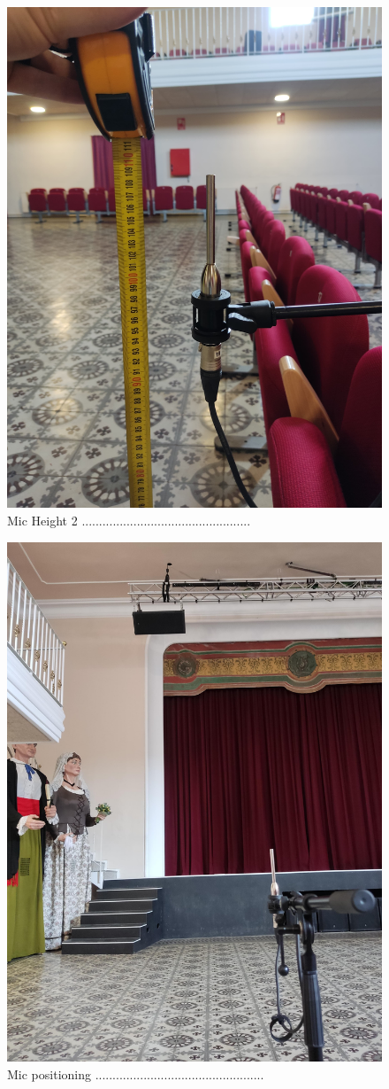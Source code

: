 \begin{figure}[H]
	\centering
	\includegraphics[width=0.6
	\linewidth]{Figures/Coro_micpos2.jpeg}
	\caption{Mic Height 2 .................................................}
	\label{fig:Mic_pos2}
\end{figure}

\begin{figure}[H]
	\centering
	\includegraphics[width=0.6
	\linewidth]{Figures/Coro_micpos3.jpeg}
	\caption{Mic positioning .................................................}
	\label{fig:Mic_pos3}
\end{figure}

